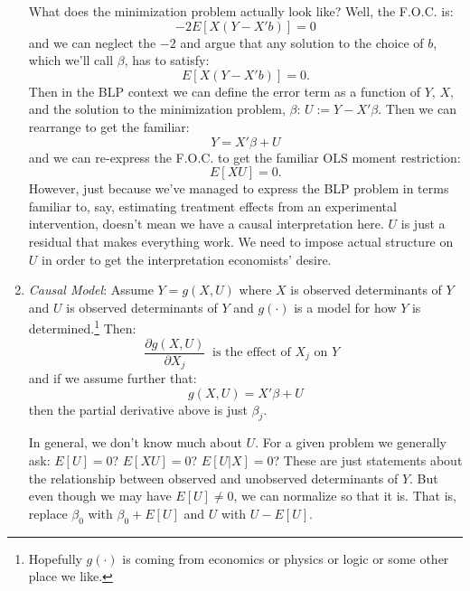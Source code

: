 \documentclass{tufte-book}
\theoremstyle{mytheoremstyle}
\theoremstyle{mylemstyle}
\theoremstyle{mydefstyle}
\begin{document}
\begin{enumerate}
What does the minimization problem actually look like? Well, the F.O.C. is:
	\[-2E[X(Y - X'b)] = 0\]
and we can neglect the \(-2\) and argue that any solution to the choice of \(b\), which we'll call \(\beta\), has to satisfy:
	\[E[X(Y - X'b)] = 0 \text{.}\]
Then in the BLP context we can define the error term as a function of \(Y\), \(X\), and the solution to the minimization problem, \(\beta\): \(U := Y - X'\beta\). Then we can rearrange to get the familiar:
	\[Y = X'\beta + U\] 
and we can re-express the F.O.C. to get the familiar OLS moment restriction:
	\[E[XU] = 0 \text{.}\] 
However, just because we've managed to express the BLP problem in terms familiar to, say, estimating treatment effects from an experimental intervention, doesn't mean we have a causal interpretation here. \(U\) is just a residual that makes everything work. We need to impose actual structure on \(U\) in order to get the interpretation economists' desire. 

\item \emph{Causal Model}: Assume \(Y = g(X, U)\) where \(X\) is observed determinants of \(Y\) and \(U\) is observed determinants of \(Y\) and \(g(\cdot)\) is a model for how \(Y\) is determined.\footnote{Hopefully \(g(\cdot)\) is coming from economics or physics or logic or some other place we like.} Then:
	\[\frac{\partial g(X, U)}{\partial X_j}\ \text{ is the effect of \(X_j\) on \(Y\) }\]
and if we assume further that:
	\[g(X, U) = X'\beta + U\]
then the partial derivative above is just \(\beta_j\). 

In general, we don't know much about \(U\). For a given problem we generally ask: \(E[U] = 0\)? \(E[XU] = 0\)? \(E[U|X] = 0\)? These are just statements about the relationship between observed and unobserved determinants of \(Y\). But even though we may have \(E[U] \ne 0\), we can normalize so that it is. That is, replace \(\beta_0\) with \(\beta_0 + E[U]\) and \(U\) with \(U - E[U]\). 
\end{enumerate}
\end{document}
